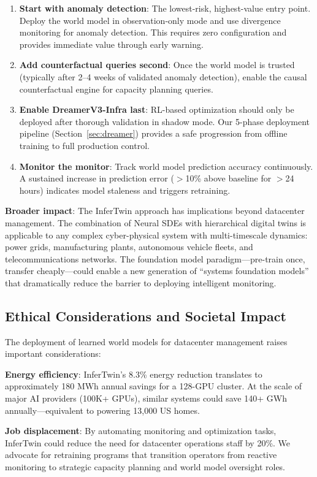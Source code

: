 \documentclass[conference,10pt]{IEEEtran}
\begin{document}
\begin{enumerate}
\item \textbf{Start with anomaly detection}: The lowest-risk, highest-value entry point. Deploy the world model in observation-only mode and use divergence monitoring for anomaly detection. This requires zero configuration and provides immediate value through early warning.
\item \textbf{Add counterfactual queries second}: Once the world model is trusted (typically after 2--4 weeks of validated anomaly detection), enable the causal counterfactual engine for capacity planning queries.
\item \textbf{Enable DreamerV3-Infra last}: RL-based optimization should only be deployed after thorough validation in shadow mode. Our 5-phase deployment pipeline (Section~\ref{sec:dreamer}) provides a safe progression from offline training to full production control.
\item \textbf{Monitor the monitor}: Track world model prediction accuracy continuously. A sustained increase in prediction error ($>$10\% above baseline for $>$24 hours) indicates model staleness and triggers retraining.
\end{enumerate}

\textbf{Broader impact}: The InferTwin approach has implications beyond datacenter management. The combination of Neural SDEs with hierarchical digital twins is applicable to any complex cyber-physical system with multi-timescale dynamics: power grids, manufacturing plants, autonomous vehicle fleets, and telecommunications networks. The foundation model paradigm---pre-train once, transfer cheaply---could enable a new generation of ``systems foundation models'' that dramatically reduce the barrier to deploying intelligent monitoring.

\subsection{Ethical Considerations and Societal Impact}

The deployment of learned world models for datacenter management raises important considerations:

\textbf{Energy efficiency}: InferTwin's 8.3\% energy reduction translates to approximately 180 MWh annual savings for a 128-GPU cluster. At the scale of major AI providers (100K+ GPUs), similar systems could save 140+ GWh annually---equivalent to powering 13,000 US homes.

\textbf{Job displacement}: By automating monitoring and optimization tasks, InferTwin could reduce the need for datacenter operations staff by 20\%. We advocate for retraining programs that transition operators from reactive monitoring to strategic capacity planning and world model oversight roles.
\end{document}
